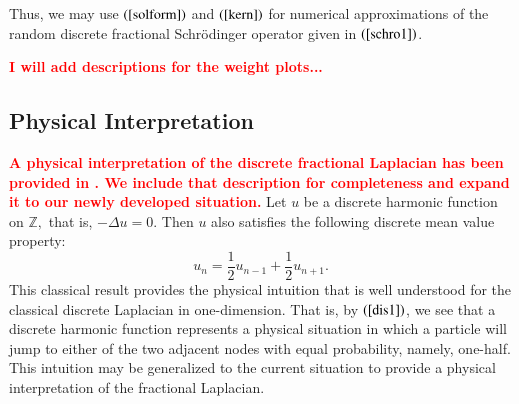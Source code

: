 \documentclass[final,1p,times]{elsarticle}
\def\ZZ{\mathbb Z} %
\newcommand{\bb}[1]{\begin{equation}\label{#1}}
\newcommand{\ee}{\end{equation}}
\newcommand{\no}{\noindent}
\def\R#1{$(\ref{#1})$}
\theoremstyle{remark}
\theoremstyle{definition}
\newcommand{\josh}[1]{\textcolor{red}{\textbf{#1}}}
\begin{document}

Thus, we may use \R{solform} and \R{kern} for numerical approximations of the random discrete fractional Schr{\"o}dinger operator given in \R{schro1}.

\vspace{3mm}

\no\josh{I will add descriptions for the weight plots...}

\begin{figure}[H]
\centering
{} 
{} 
\caption{}
\end{figure}

\subsection{Physical Interpretation}



\josh{A physical interpretation of the discrete fractional Laplacian has been provided in \cite{ciaurri2016nonlocal}. We include that description for completeness and expand it to our newly developed situation.}
Let $u$ be a discrete harmonic function on $\ZZ,$ that is, $-\Delta u = 0.$ Then $u$ also satisfies the following discrete mean value property:
\bb{dis1}
u_n = \frac{1}{2}u_{n-1}+\frac{1}{2}u_{n+1}.
\ee
This classical result provides the physical intuition that is well understood for the classical discrete Laplacian in one-dimension. That is, by \R{dis1}, we see that a discrete harmonic function represents a physical situation in which a particle will jump to either of the two adjacent nodes with equal probability, namely, one-half. This intuition may be generalized to the current situation to provide a physical interpretation of the fractional Laplacian. 
\end{document}
